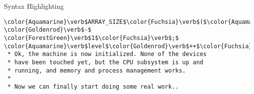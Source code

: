 \begin{frame}{Syntax Highlighting}
\begin{verbatim}
\color{Aquamarine}\verb$ARRAY_SIZE$\color{Fuchsia}\verb$($\color{Aquamarine}\verb$initcall_levels$\color{Fuchsia}\verb$)$ \color{Goldenrod}\verb$-$ \color{ForestGreen}\verb$1$\color{Fuchsia}\verb$;$ \color{Aquamarine}\verb$level$\color{Goldenrod}\verb$++$\color{Fuchsia}\verb$)$\newline\tab\tab\color{Aquamarine}\verb$do_initcall_level$\color{Fuchsia}\verb$($\color{Aquamarine}\verb$level$\color{Fuchsia}\verb$)$\color{Fuchsia}\verb$;$\newline\color{Fuchsia}\verb$}$\newline\newline\color{Rhodamine}\begin{verbatim}/*
 * Ok, the machine is now initialized. None of the devices
 * have been touched yet, but the CPU subsystem is up and
 * running, and memory and process management works.
 *
 * Now we can finally start doing some real work..

\end{verbatim}
\end{frame}
